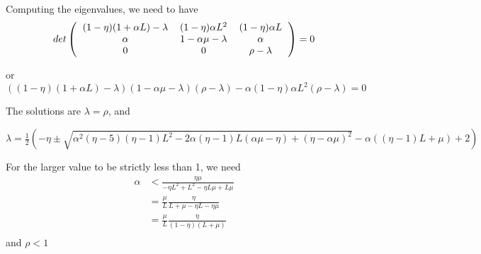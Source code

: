 \documentclass[11pt]{article}
\begin{document}
	Computing the eigenvalues, we need to have
	\[	det \left(  \begin{tabular}{ccc}
		$(1-\eta)(1+\alpha L) - \lambda $ & $(1-\eta)\alpha L^2 $& $(1- \eta)\alpha L$ \\
		$\alpha$ &$ 1 -\alpha \mu- \lambda$ & $\alpha$\\
		0 & 0 & $\rho- \lambda$
		\end{tabular} \right) = 0
	\]
	
	or 
	\begin{equation}
		((1-\eta)(1+\alpha L) - \lambda)(1 -\alpha \mu- \lambda)(\rho- \lambda) - \alpha(1-\eta)\alpha L^2(\rho- \lambda) = 0
	\end{equation}
	
	The solutions are $\lambda  = \rho$, and
	
	 $\lambda  =\frac{1}{2} \left(-\eta \pm \sqrt{\alpha ^2 (\eta -5) (\eta -1) L^2-2 \alpha  (\eta -1) L (\alpha  \mu-\eta )+(\eta -\alpha  \mu)^2}-\alpha  ((\eta -1) L+\mu)+2\right)$
	
	For the larger value to be strictly less than 1, we need 
	\begin{align*}
	\alpha &< \frac{\eta  \mu}{-\eta  L^2+L^2-\eta  L \mu+L \mu} \\
	       &= \frac{\mu}{L} \frac{\eta  }{L+ \mu-\eta  L-\eta   \mu} \\
	       &= \frac{\mu}{L} \frac{\eta  }{(1-\eta)(  L+ \mu)} \\
	\end{align*}
	and 
	$\rho<1$
	
\end{document}
